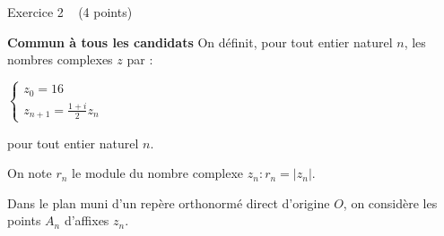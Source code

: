 
%
\begin{h2}Exercice 2   (4 points)\end{h2}
\textbf{Commun  à tous les candidats}
On définit, pour tout entier naturel $n$, les nombres complexes $z$ par :
\par
$\left\{ \begin{matrix} z_{0} = 16 \\ z_{n+1}  = \frac{1+i}{2}z_{n}\end{matrix}\right.$
     \par
     pour tout entier naturel $n$.
     \par
     On note $r_{n}$ le module du nombre complexe $z_{n}:  r_{n} =|z_{n}|$.
     \par
     Dans le plan muni d'un repère orthonormé direct d'origine $O$, on considère les points $A_{n}$ d'affixes $z_{n}$.
